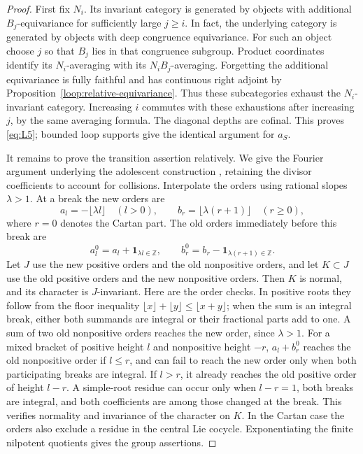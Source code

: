 \begin{proof}
First fix \(N_i\).  Its invariant category is generated by objects with
additional \(B_j\)-equivariance for sufficiently large \(j\geq i\).
In fact, the underlying category is generated by objects with deep
congruence equivariance.  For such an object choose \(j\) so that
\(B_j\) lies in that congruence subgroup.  Product coordinates identify
its \(N_i\)-averaging with its \(N_iB_j\)-averaging.  Forgetting the
additional equivariance is fully faithful and has continuous right
adjoint by Proposition~\ref{loop:relative-equivariance}.  Thus these
subcategories exhaust the \(N_i\)-invariant category.  Increasing
\(i\) commutes with these exhaustions after increasing \(j\), by the
same averaging formula.  The diagonal depths are cofinal.  This proves
\eqref{eq:L5}; bounded loop supports give the identical argument for
\(a_S\).

It remains to prove the transition assertion relatively.  We give the
Fourier argument underlying the adolescent construction
\cite[Section~2]{RaskinW}, retaining the divisor coefficients to account
for collisions.  Interpolate the orders using rational slopes
\(\lambda>1\).  At a break the new orders are
\[
 a_l=-\lfloor\lambda l\rfloor\quad(l>0),\qquad
 b_r=\lfloor\lambda(r+1)\rfloor\quad(r\geq0),
\]
where \(r=0\) denotes the Cartan part.  The old orders immediately
before this break are
\[
 a_l^0=a_l+\mathbf1_{\lambda l\in\mathbb Z},\qquad
 b_r^0=b_r-\mathbf1_{\lambda(r+1)\in\mathbb Z}.
\]
Let \(J\) use the new positive orders and the old nonpositive orders,
and let \(K\subset J\) use the old positive orders and the new
nonpositive orders.  Then \(K\) is normal, and its character is
\(J\)-invariant.  Here are the order checks.  In positive roots they
follow from the floor inequality
\(\lfloor x\rfloor+\lfloor y\rfloor\leq\lfloor x+y\rfloor\);
when the sum is an integral break, either both summands are integral
or their fractional parts add to one.  A sum of two old nonpositive
orders reaches the new order, since \(\lambda>1\).  For a mixed
bracket of positive height \(l\) and nonpositive height \(-r\),
\(a_l+b_r^0\) reaches the old nonpositive order if \(l\leq r\),
and can fail to reach the new order only when both participating
breaks are integral.  If \(l>r\), it already reaches the old positive
order of height \(l-r\).  A simple-root residue can occur only when
\(l-r=1\), both breaks are integral, and both coefficients are among
those changed at the break.  This verifies normality and invariance
of the character on \(K\).  In the Cartan case the orders also exclude
a residue in the central Lie cocycle.  Exponentiating the finite
nilpotent quotients gives the group assertions.


\end{proof}
